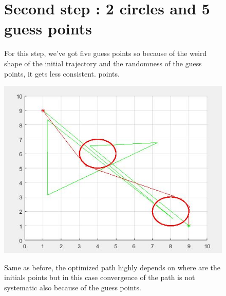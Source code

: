 \begin{figure}
\vspace{-10mm}

\section{Second step : 2 circles and 5 guess points}
For this step, we've got five guess points so because of the weird shape of the initial trajectory and the randomness of the guess points, it gets less consistent. points.

\begin{center}
\includegraphics[width=1\textwidth]{level2.JPG}
\end{center}

Same as before, the optimized path highly depends on where are the initials points but in this case convergence of the path is not systematic also because of the guess points.
\vspace{5mm}




\end{figure}


